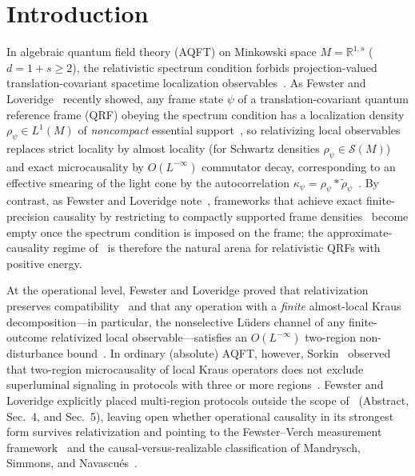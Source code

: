 \documentclass[11pt,a4paper]{article}
\theoremstyle{definition}
\theoremstyle{remark}
\newcommand{\RR}{\mathbb{R}}
\begin{document}
\begin{abstract}
\end{abstract}

\section{Introduction}
\label{sec:intro}

In algebraic quantum field theory (AQFT) on Minkowski space $M = \RR^{1,s}$ ($d=1+s\ge 2$), the relativistic spectrum condition forbids projection-valued translation-covariant spacetime localization observables~\cite{Giannitrapani1998,Toller1999,FewsterLoveridge2026}. As Fewster and Loveridge~\cite{FewsterLoveridge2026} recently showed, any frame state $\psi$ of a translation-covariant quantum reference frame (QRF) obeying the spectrum condition has a localization density $\rho_\psi \in L^1(M)$ of \emph{noncompact} essential support~\cite[Lem.~3.1]{FewsterLoveridge2026}, so relativizing local observables replaces strict locality by almost locality (for Schwartz densities $\rho_\psi\in\mathcal{S}(M)$) and exact microcausality by $O(L^{-\infty})$ commutator decay, corresponding to an effective smearing of the light cone by the autocorrelation $\kappa_\psi = \rho_\psi * \tilde{\rho}_\psi$~\cite[Rem.~3.7]{FewsterLoveridge2026}. By contrast, as Fewster and Loveridge note~\cite{FewsterLoveridge2026}, frameworks that achieve exact finite-precision causality by restricting to compactly supported frame densities~\cite{FedidaGlowacki2025} become empty once the spectrum condition is imposed on the frame; the approximate-causality regime of~\cite{FewsterLoveridge2026} is therefore the natural arena for relativistic QRFs with positive energy.

At the operational level, Fewster and Loveridge proved that relativization preserves compatibility~\cite[Prop.~4.2]{FewsterLoveridge2026} and that any operation with a \emph{finite} almost-local Kraus decomposition---in particular, the nonselective L\"uders channel of any finite-outcome relativized local observable---satisfies an $O(L^{-\infty})$ two-region non-disturbance bound~\cite[Prop.~4.4(ii) and Cor.~4.7]{FewsterLoveridge2026}. In ordinary (absolute) AQFT, however, Sorkin~\cite{Sorkin1993} observed that two-region microcausality of local Kraus operators does not exclude superluminal signaling in protocols with three or more regions~\cite{BorstenJubbKells2021,BostelmannFewsterRuep2021,Jubb2022,Mandrysch2026}. Fewster and Loveridge explicitly placed multi-region protocols outside the scope of~\cite{FewsterLoveridge2026} (Abstract, Sec.~4, and Sec.~5), leaving open whether operational causality in its strongest form survives relativization and pointing to the Fewster--Verch measurement framework~\cite{FewsterVerch2020} and the causal-versus-realizable classification of Mandrysch, Simmons, and Navascu\'es~\cite{Mandrysch2026}.
\end{document}
